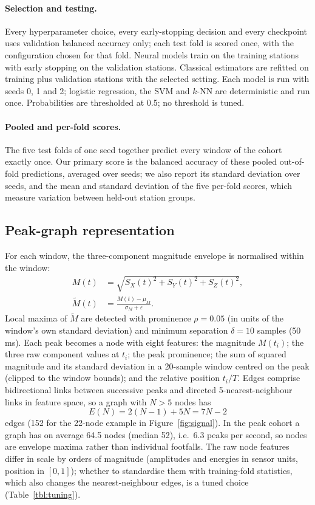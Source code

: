 \documentclass[a4paper,fleqn]{cas-dc}
\begin{document}
\paragraph{Selection and testing.} Every hyperparameter choice, every early-stopping
decision and every checkpoint uses validation balanced accuracy only; each test fold is
scored once, with the configuration chosen for that fold. Neural models train on the
training stations with early stopping on the validation stations. Classical estimators
are refitted on training plus validation stations with the selected setting. Each model
is run with seeds 0, 1 and 2; logistic regression, the SVM and $k$-NN are deterministic
and run once. Probabilities are thresholded at 0.5; no threshold is tuned.

\paragraph{Pooled and per-fold scores.} The five test folds of one seed together
predict every window of the cohort exactly once. Our primary score is the balanced
accuracy of these pooled out-of-fold predictions, averaged over seeds; we also report its
standard deviation over seeds, and the mean and standard deviation of the five per-fold
scores, which measure variation between held-out station groups.

\subsection{Peak-graph representation}\label{sec:peakgraph}
For each window, the three-component magnitude envelope is normalised within the
window:
\begin{equation}
\begin{aligned}
M(t)&=\sqrt{S_X(t)^2+S_Y(t)^2+S_Z(t)^2},\\
\tilde{M}(t)&=\frac{M(t)-\mu_M}{\sigma_M+\varepsilon}.
\end{aligned}
\end{equation}
Local maxima of $\tilde{M}$ are detected with prominence $\rho=0.05$ (in units of the
window's own standard deviation) and minimum separation $\delta=10$ samples (50\,ms).
Each peak becomes a node with eight features: the magnitude $M(t_i)$; the three raw
component values at $t_i$; the peak prominence; the sum of squared magnitude and its
standard deviation in a 20-sample window centred on the peak (clipped to the window
bounds); and the relative position $t_i/T$. Edges comprise bidirectional links between
successive peaks and directed 5-nearest-neighbour links in feature space, so a graph
with $N>5$ nodes has
\begin{equation}
E(N)=2(N-1)+5N=7N-2
\end{equation}
edges (152 for the 22-node example in Figure~\ref{fig:signal}). In the peak cohort a
graph has on average 64.5 nodes (median 52), i.e.\ 6.3 peaks per second, so nodes are
envelope maxima rather than individual footfalls. The raw node features differ in scale
by orders of magnitude (amplitudes and energies in sensor units, position in $[0,1]$);
whether to standardise them with training-fold statistics, which also changes the
nearest-neighbour edges, is a tuned choice (Table~\ref{tbl:tuning}).
\end{document}
